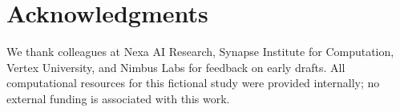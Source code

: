 \section*{Acknowledgments}
We thank colleagues at Nexa AI Research, Synapse Institute for Computation,
Vertex University, and Nimbus Labs for feedback on early drafts. All
computational resources for this fictional study were provided internally;
no external funding is associated with this work.



